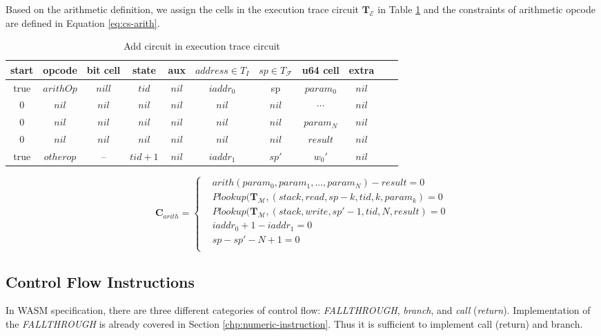 Based on the arithmetic definition, we assign the cells in the execution trace circuit $\mathbf{T}_\mathcal{E}$ in Table \ref{tbl:arith-instruction} and the constraints of arithmetic opcode are defined in Equation \ref{eq:cs-arith}.
\begin{table}[!h]
\small
\begin{center}
\caption{Add circuit in execution trace circuit}
\label{tbl:arith-instruction}
\begin{tabular}{ | c | c | c | c | c | c | c | c | c | c | c | }
  \hline
  start & opcode & bit cell & state & aux & $address \in T_{I}$ & $sp \in T_\mathcal{F}$& u64 cell & extra \\ 
  \hline
   true & $arithOp$ & $nill$ & $tid$ & $nil$ & $iaddr_0$ & sp & $param_0$ & $nil$\\ 
 \hline
   0 & $nil$ & $nil$ & $nil$ & $nil$ & $nil$ & $nil$ & $\cdots$ & $nil$\\ 
 \hline
   0 & $nil$ & $nil$ & $nil$ & $nil$ & $nil$ & $nil$ & $param_N$ & $nil$\\ 
 \hline
   0 & $nil$ & $nil$ & $nil$ & $nil$ & $nil$ & $nil$ & $result$ & $nil$\\ 
 \hline
    true & $otherop$ & -- & $tid+1$ & $nil$ & $iaddr_1$ & $sp'$ & $w_0'$ & $nil$\\
 \hline
\end{tabular}

\end{center}
\end{table}
\begin{equation}
    \mathbf{C}_{arith} = \begin{cases}
        &arith(param_0, param_1, ..., param_N) - result = 0 \\
        &Plookup(\mathbf{T}_\mathcal{M}, (stack, read, sp - k, tid, k, param_k) = 0 \\
        &Plookup(\mathbf{T}_\mathcal{M}, (stack, write, sp' - 1, tid, N, result) = 0 \\
        &iaddr_0 + 1 - iaddr_1 = 0\\
        &sp - sp' - N + 1 = 0\\
    \end{cases}
\label{eq:cs-arith}
\end{equation}
\subsection{Control Flow Instructions}
\label{chp:control-flow-ins}
In WASM specification, there are three different categories of control flow: \emph{FALLTHROUGH}, \emph{branch}, and \emph{call} (\emph{return}). Implementation of the \emph{FALLTHROUGH} is already covered in Section \ref{chp:numeric-instruction}. Thus it is sufficient to implement call (return) and branch.\\

